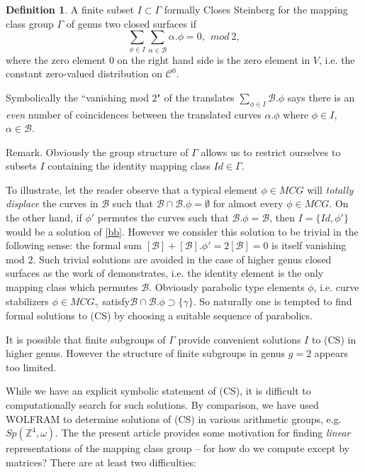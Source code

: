 \documentclass[12pt]{amsart}
\theoremstyle{definition}
\newtheorem{dfn}[thm]{Definition}
\theoremstyle{remark}
\newcommand{\bZ}{\mathbb{Z}}
\newcommand{\sB}{\mathscr{B}}
\newcommand{\sC}{\mathscr{C}}
\begin{document}
\begin{dfn}
A finite subset $I\subset \Gamma$ formally Closes Steinberg for the mapping class group $\Gamma$ of genus two closed surfaces if 
\begin{equation}
\label{bb}
\sum_{\phi\in I} \sum_{\alpha\in \sB}\alpha.\phi=0, ~~mod~2,
\end{equation}
where the zero element $0$ on the right hand side is the zero element in $V$, i.e. the constant zero-valued distribution on $\sC^0$. 
\end{dfn}

Symbolically the ``vanishing mod $2$" of the translates $\sum_{\phi\in I} \sB.\phi$ says there is an \emph{even} number of coincidences between the translated curves $\alpha.\phi$ where $\phi\in I$, $\alpha\in \sB$. 

Remark. Obviously the group structure of $\Gamma$ allows us to restrict ourselves to subsets $I$ containing the identity mapping class $Id\in \Gamma$. 

To illustrate, let the reader observe that a typical element $\phi\in MCG$ will \emph{totally displace} the curves in $\sB$ such that $\sB \cap \sB.\phi=\emptyset$ for almost every $\phi\in MCG$. On the other hand, if $\phi'$ permutes the curves such that $\sB.\phi=\sB$, then $I=\{Id,\phi'\}$ would be a solution of \eqref{bb}. However we consider this solution to be trivial in the following sense: the formal sum $[\sB]+[\sB].\phi'=2[\sB]=0$ is itself vanishing mod $2$. Such trivial solutions are avoided in the case of higher genus closed surfaces as the work of \cite{birman2013finite} demonstrates, i.e. the identity element is the only mapping class which permutes $\sB$. Obviously parabolic type elements $\phi$, i.e. curve stabilizers $\phi\in MCG_\gamma$ satisfy$\sB \cap \sB.\phi \supset \{\gamma\}$. So naturally one is tempted to find formal solutions to (CS) by choosing a suitable sequence of parabolics. 

It is possible that finite subgroups of $\Gamma$ provide convenient solutions $I$ to (CS) in higher genus. However the structure of finite subgroups in genus $g=2$ appears too limited.

While we have an explicit symbolic statement of (CS), it is difficult to computationally search for such solutions. By comparison, we have used WOLFRAM to determine solutions of (CS) in various arithmetic groups, e.g. $Sp(\bZ^4, \omega)$. The the present article provides some motivation for finding \emph{linear} representations of the mapping class group -- for how do we compute except by matrices? There are at least two difficulties: 
\end{document}
